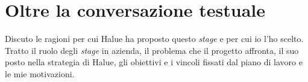 
\chapter{Oltre la conversazione testuale}

Discuto le ragioni per cui Halue ha proposto questo \emph{stage} e per cui io l’ho scelto. Tratto
il ruolo degli \emph{stage} in azienda, il problema che il progetto affronta, il suo posto nella
strategia di Halue, gli obiettivi e i vincoli fissati dal piano di lavoro e le mie motivazioni.










